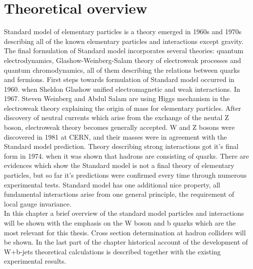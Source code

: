 
\chapter{Theoretical overview} %

\label{Chapter2} %


Standard model of elementary particles is a theory emerged in 1960s and 1970s describing all of the known elementary particles and interactions except gravity. The final formulation of Standard model incorporates several theories: quantum electrodynamics, Glashow-Weinberg-Salam theory of electroweak processes and quantum chromodynamics, all of them describing the relations between quarks and fermions. First steps towards formulation of Standard model occurred in 1960. when Sheldon Glashow unified electromagnetic and weak interactions. In 1967. Steven Weinberg and Abdul Salam are using Higgs mechanism in the electroweak theory explaining the origin of mass for elementary particles. After discovery of neutral currents which arise from the exchange of the neutal Z boson, electroweak theory becomes generally accepted. W and Z bosons were discovered in 1981 at CERN, and their masses were in agreement with the Standard model prediction. Theory describing strong interactions got it's final form in 1974. when it was shown that hadrons are consisting of quarks. There are evidences which show the Standard model is not a final theory of elementary particles, but so far it's predictions were confirmed every time through numerous experimental tests. Standard model has one additional nice property, all fundamental interactions arise from one general principle, the requirement of local gauge invariance. \\
In this chapter a brief overview of the standard model particles and interactions will be shown with the emphasis on the W boson and b quarks which are the most relevant for this thesis. Cross section determination at hadron colliders will be shown.  In the last part of the chapter historical account of the development of W+b-jets theoretical calculations is described together with the existing experimental results.


